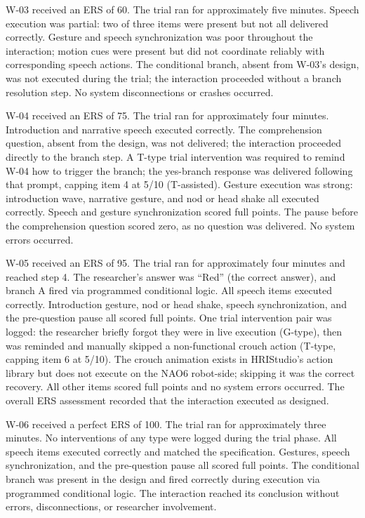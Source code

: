 W-03 received an ERS of 60. The trial ran for approximately five minutes. Speech execution was partial: two of three items were present but not all delivered correctly. Gesture and speech synchronization was poor throughout the interaction; motion cues were present but did not coordinate reliably with corresponding speech actions. The conditional branch, absent from W-03's design, was not executed during the trial; the interaction proceeded without a branch resolution step. No system disconnections or crashes occurred.

W-04 received an ERS of 75. The trial ran for approximately four minutes. Introduction and narrative speech executed correctly. The comprehension question, absent from the design, was not delivered; the interaction proceeded directly to the branch step. A T-type trial intervention was required to remind W-04 how to trigger the branch; the yes-branch response was delivered following that prompt, capping item 4 at 5/10 (T-assisted). Gesture execution was strong: introduction wave, narrative gesture, and nod or head shake all executed correctly. Speech and gesture synchronization scored full points. The pause before the comprehension question scored zero, as no question was delivered. No system errors occurred.

W-05 received an ERS of 95. The trial ran for approximately four minutes and reached step 4. The researcher's answer was ``Red'' (the correct answer), and branch A fired via programmed conditional logic. All speech items executed correctly. Introduction gesture, nod or head shake, speech synchronization, and the pre-question pause all scored full points. One trial intervention pair was logged: the researcher briefly forgot they were in live execution (G-type), then was reminded and manually skipped a non-functional crouch action (T-type, capping item 6 at 5/10). The crouch animation exists in HRIStudio's action library but does not execute on the NAO6 robot-side; skipping it was the correct recovery. All other items scored full points and no system errors occurred. The overall ERS assessment recorded that the interaction executed as designed.

W-06 received a perfect ERS of 100. The trial ran for approximately three minutes. No interventions of any type were logged during the trial phase. All speech items executed correctly and matched the specification. Gestures, speech synchronization, and the pre-question pause all scored full points. The conditional branch was present in the design and fired correctly during execution via programmed conditional logic. The interaction reached its conclusion without errors, disconnections, or researcher involvement.

